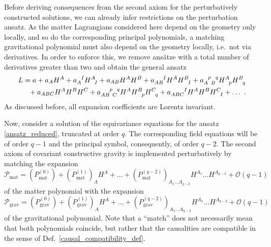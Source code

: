 Before deriving consequences from the second axiom for the perturbatively constructed solutions, we can already infer restrictions on the perturbation ansatz. As the matter Lagrangians considered here depend on the geometry only locally, and so do the corresponding principal polynomials, a matching gravitational polynomial must also depend on the geometry locally, i.e.~not via derivatives. In order to enforce this, we remove ansätze with a total number of derivatives greater than two and obtain the general ansatz
\begin{equation}\label{ansatz_reduced}
  \begin{aligned}
    L &{} = a + a_A H^A + a_A^{\hphantom AI} H^A_{\hphantom AI} + a_{AB} H^A H^B + a_{AB}^{\hphantom{AB}I} H^A H^B_{\hphantom BI} + a_{A\hphantom pB}^{\hphantom Ap\hphantom Bq} H^A_{\hphantom Ap} H^B_{\hphantom Bq} \\
      &{} \hphantom{=} + a_{ABC} H^A H^B H^C + a_{AB\hphantom pC}^{\hphantom{AB}p\hphantom Cq} H^A H^B_{\hphantom Bp} H^C_{\hphantom Cq} + a_{ABC}^{\hphantom{ABC}I} H^A H^B H^C_{\hphantom CI} + \dots \ .
  \end{aligned}
\end{equation}
As discussed before, all expansion coefficients are Lorentz invariant.

Now, consider a solution of the equivariance equations for the ansatz \eqref{ansatz_reduced}, truncated at order $q$. The corresponding field equations will be of order $q-1$ and the principal symbol, consequently, of order $q-2$. The second axiom of covariant constructive gravity is implemented perturbatively by matching the expansion
\begin{equation}\label{expansion_matter_poly}
  \mathcal P_\text{mat} = (P^{(0)}_\text{mat}) + (P^{(1)}_\text{mat})_A H^A + \dots + (P^{(q-2)}_\text{mat})_{A_1\dots A_{q-2}} H^{A_1} \dots H^{A_{q-2}} + \mathcal O(q-1)
\end{equation}
of the matter polynomial with the expansion
\begin{equation}\label{expansion_grav_poly}
  \mathcal P_\text{grav} = (P^{(0)}_\text{grav}) + (P^{(1)}_\text{grav})_A H^A + \dots + (P^{(q-2)}_\text{grav})_{A_1\dots A_{q-2}} H^{A_1} \dots H^{A_{q-2}} + \mathcal O(q-1)
\end{equation}
of the gravitational polynomial. Note that a ``match'' does not necessarily mean that both polynomials coincide, but rather that the causalities are compatible in the sense of Def.~\ref{causal_compatibility_def}.

